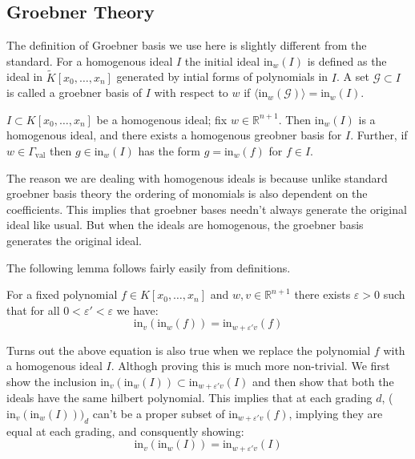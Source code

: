     \subsection{Groebner Theory}
    The definition of Groebner basis we use here is slightly different from the standard. 
    For a homogenous ideal $I$ the initial ideal $\text{in}_{w}(I)$ is defined as the ideal in $\tilde{K}[x_0,\dots,x_n]$ generated by intial forms of polynomials in $I$. 
    A set $\mathcal{G} \subset I$ is called a groebner basis of $I$ with respect to $w$ if $\langle\text{in}_{w}\left(\mathcal{G}\right)\rangle = \text{in}_{w}(I)$.
    \begin{lemma}
        $I \subset K[x_0,\dots, x_n]$ be a homogenous ideal; fix $w\in \mathbb{R}^{n+1}$. Then $\text{in}_{w}(I)$ is a homogenous ideal, and there exists a homogenous greobner basis for $I$. Further, if $w \in \Gamma_{\text{val}}$ then $g \in \text{in}_{w}(I)$ has the form $g = \text{in}_{w}(f)$ for $f \in I$.
    \end{lemma}
    The reason we are dealing with homogenous ideals is because unlike standard groebner basis theory the ordering of monomials is also dependent on the coefficients. This implies that groebner bases needn't always generate the original ideal like usual. But when the ideals are homogenous, the groebner basis generates the original ideal.
    \par The following lemma follows fairly easily from definitions.
    \begin{lemma}
        For a fixed polynomial $f \in K[x_0,\dots,x_n]$ and $w,v \in \mathbb{R}^{n+1}$ there exists $\varepsilon >0$ such that for all $0<\varepsilon ' < \varepsilon$ we have:
        \begin{equation*}
            \text{in}_{v}(\text{in}_{w}(f)) = \text{in}_{w + \varepsilon 'v}(f)
        \end{equation*}
    \end{lemma}
    Turns out the above equation is also true when we replace the polynomial $f$ with a homogenous ideal $I$. Althogh proving this is much more non-trivial. 
    We first show the inclusion $\text{in}_{v}(\text{in}_{w}(I)) \subset \text{in}_{w + \varepsilon 'v}(I)$ and then show that both the ideals have the same hilbert polynomial. 
    This implies that at each grading $d$, ($\text{in}_{v}(\text{in}_{w}(I)))_d$ can't be a proper subset of $\text{in}_{w + \varepsilon 'v}(f)$, implying they are equal at each grading, and consquently showing:
    \begin{equation*}
        \text{in}_{v}(\text{in}_{w}(I)) = \text{in}_{w + \varepsilon 'v}(I)
    \end{equation*}
